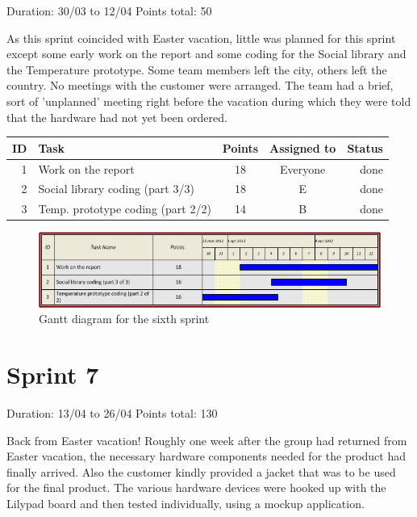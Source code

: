 Duration: 30/03 to 12/04\newline
Points total: 50

As this sprint coincided with Easter vacation, little was planned for this
sprint except some early work on the report and some coding for the Social
library and the Temperature prototype. Some team members left the city, others
left the country. No meetings with the customer were arranged. The team had a
brief, sort of 'unplanned' meeting right before the vacation during which they
were told that the hardware had not yet been ordered.

\begin{table}[ht!]
\begin{tabular}{ | r | l | c | c | r | }

\hline
\textbf{ID} & \textbf{Task} & \textbf{Points} & \textbf{Assigned to} & \textbf{Status} \\
\hline

1 & Work on the report						& 18 & Everyone & done \\
\hline
2 & Social library coding (part 3/3)		& 18 & E		& done \\
\hline
3 & Temp. prototype coding (part 2/2)		& 14 & B		& done \\
\hline

\end{tabular}
\end{table}

\begin{figure}[h!]
\centering \includegraphics[scale=0.8]{img/sprints-gantt6.png}
\caption{Gantt diagram for the sixth sprint}
\label{fig:sprints-gantt6}
\end{figure}

\newpage

\section{Sprint 7}

Duration: 13/04 to 26/04\newline
Points total: 130

Back from Easter vacation! Roughly one week after the group had returned from
Easter vacation, the necessary hardware components needed for the product had
finally arrived. Also the customer kindly provided a jacket that was to be
used for the final product. The various hardware devices were hooked up with the
Lilypad board and then tested individually, using a mockup application.

